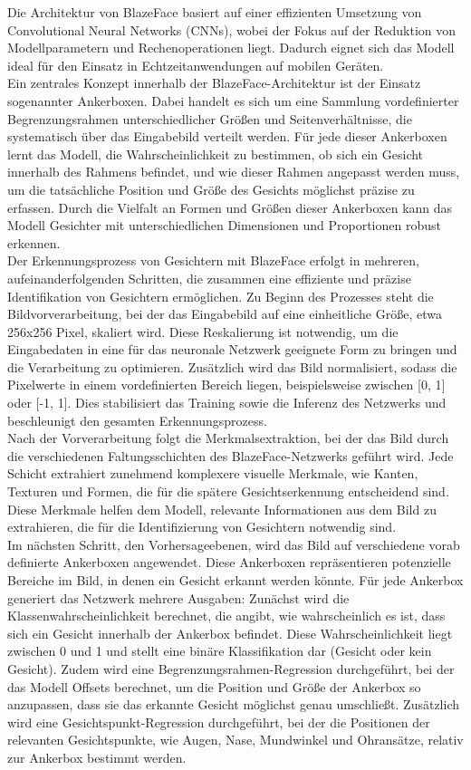 Die Architektur von BlazeFace basiert auf einer effizienten Umsetzung von Convolutional Neural Networks (CNNs), wobei der Fokus auf der Reduktion von Modellparametern und Rechenoperationen liegt. Dadurch eignet sich das Modell ideal für den Einsatz in Echtzeitanwendungen auf mobilen Geräten. \\
Ein zentrales Konzept innerhalb der BlazeFace-Architektur ist der Einsatz sogenannter Ankerboxen. Dabei handelt es sich um eine Sammlung vordefinierter Begrenzungsrahmen unterschiedlicher Größen und Seitenverhältnisse, die systematisch über das Eingabebild verteilt werden. Für jede dieser Ankerboxen lernt das Modell, die Wahrscheinlichkeit zu bestimmen, ob sich ein Gesicht innerhalb des Rahmens befindet, und wie dieser Rahmen angepasst werden muss, um die tatsächliche Position und Größe des Gesichts möglichst präzise zu erfassen. Durch die Vielfalt an Formen und Größen dieser Ankerboxen kann das Modell Gesichter mit unterschiedlichen Dimensionen und Proportionen robust erkennen. \\
Der Erkennungsprozess von Gesichtern mit BlazeFace erfolgt in mehreren, aufeinanderfolgenden Schritten, die zusammen eine effiziente und präzise Identifikation von Gesichtern ermöglichen. Zu Beginn des Prozesses steht die Bildvorverarbeitung, bei der das Eingabebild auf eine einheitliche Größe, etwa 256x256 Pixel, skaliert wird. Diese Reskalierung ist notwendig, um die Eingabedaten in eine für das neuronale Netzwerk geeignete Form zu bringen und die Verarbeitung zu optimieren. Zusätzlich wird das Bild normalisiert, sodass die Pixelwerte in einem vordefinierten Bereich liegen, beispielsweise zwischen [0, 1] oder [-1, 1]. Dies stabilisiert das Training sowie die Inferenz des Netzwerks und beschleunigt den gesamten Erkennungsprozess. \\
Nach der Vorverarbeitung folgt die Merkmalsextraktion, bei der das Bild durch die verschiedenen Faltungsschichten des BlazeFace-Netzwerks geführt wird. Jede Schicht extrahiert zunehmend komplexere visuelle Merkmale, wie Kanten, Texturen und Formen, die für die spätere Gesichtserkennung entscheidend sind. Diese Merkmale helfen dem Modell, relevante Informationen aus dem Bild zu extrahieren, die für die Identifizierung von Gesichtern notwendig sind. \\ 
Im nächsten Schritt, den Vorhersageebenen, wird das Bild auf verschiedene vorab definierte Ankerboxen angewendet. Diese Ankerboxen repräsentieren potenzielle Bereiche im Bild, in denen ein Gesicht erkannt werden könnte. Für jede Ankerbox generiert das Netzwerk mehrere Ausgaben: Zunächst wird die Klassenwahrscheinlichkeit berechnet, die angibt, wie wahrscheinlich es ist, dass sich ein Gesicht innerhalb der Ankerbox befindet. Diese Wahrscheinlichkeit liegt zwischen 0 und 1 und stellt eine binäre Klassifikation dar (Gesicht oder kein Gesicht). Zudem wird eine Begrenzungsrahmen-Regression durchgeführt, bei der das Modell Offsets berechnet, um die Position und Größe der Ankerbox so anzupassen, dass sie das erkannte Gesicht möglichst genau umschließt. Zusätzlich wird eine Gesichtspunkt-Regression durchgeführt, bei der die Positionen der relevanten Gesichtspunkte, wie Augen, Nase, Mundwinkel und Ohransätze, relativ zur Ankerbox bestimmt werden. \\
